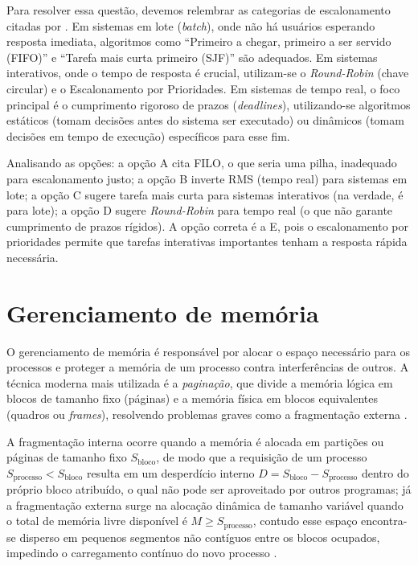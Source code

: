 \documentclass[12pt,a4paper]{article}
\begin{document}
Para resolver essa questão, devemos relembrar as categorias de escalonamento citadas por \textcite[seç.~2.4]{tanenbaum2016}.
Em sistemas em lote (\textit{batch}), onde não há usuários esperando resposta imediata,
algoritmos como ``Primeiro a chegar, primeiro a ser servido (FIFO)'' e ``Tarefa mais curta primeiro (SJF)'' são adequados.
Em sistemas interativos, onde o tempo de resposta é crucial, utilizam-se o \textit{Round-Robin} (chave circular)
e o Escalonamento por Prioridades.
Em sistemas de tempo real, o foco principal é o cumprimento rigoroso de prazos (\textit{deadlines}),
utilizando-se algoritmos estáticos (tomam decisões antes do sistema ser executado)
ou dinâmicos (tomam decisões em tempo de execução) específicos para esse fim.

Analisando as opções:
a opção A cita FILO, o que seria uma pilha, inadequado para escalonamento justo;
a opção B inverte RMS (tempo real) para sistemas em lote;
a opção C sugere tarefa mais curta para sistemas interativos (na verdade, é para lote);
a opção D sugere \textit{Round-Robin} para tempo real (o que não garante cumprimento de prazos rígidos).
A opção correta é a E, pois o escalonamento por prioridades permite que tarefas interativas importantes tenham a resposta rápida necessária.

\section{Gerenciamento de memória}
O gerenciamento de memória é responsável por alocar o espaço necessário para os processos
e proteger a memória de um processo contra interferências de outros.
A técnica moderna mais utilizada é a \emph{paginação}, que divide a memória lógica em blocos de tamanho fixo (páginas)
e a memória física em blocos equivalentes (quadros ou \textit{frames}),
resolvendo problemas graves como a fragmentação externa \parencite[cap.~3]{tanenbaum2016}.

A fragmentação interna ocorre quando a memória é alocada em partições ou páginas de tamanho fixo $S_{\text{bloco}}$,
de modo que a requisição de um processo $S_{\text{processo}} < S_{\text{bloco}}$
resulta em um desperdício interno $D = S_{\text{bloco}} - S_{\text{processo}}$ dentro do próprio bloco atribuído,
o qual não pode ser aproveitado por outros programas;
já a fragmentação externa surge na alocação dinâmica de tamanho variável
quando o total de memória livre disponível é $M \ge S_{\text{processo}}$,
contudo esse espaço encontra-se disperso em pequenos segmentos não contíguos entre os blocos ocupados,
impedindo o carregamento contínuo do novo processo \parencite[cap.~3]{tanenbaum2016}.
\end{document}
